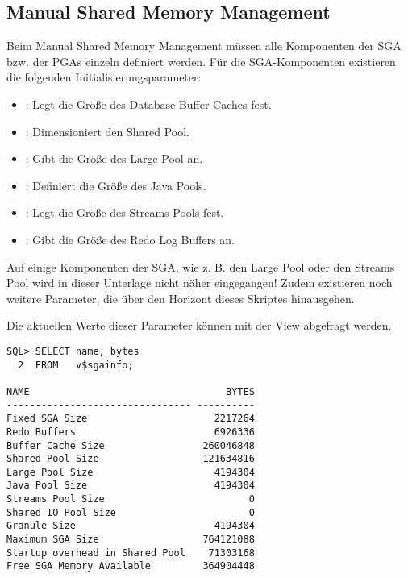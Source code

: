       \subsection{Manual Shared Memory Management}
        Beim Manual Shared Memory Management m\"ussen alle Komponenten der SGA bzw. der PGAs einzeln definiert werden. F\"ur die SGA-Komponenten existieren die folgenden Initialisierungsparameter:
        \begin{itemize}
          \item {}: Legt die Gr\"o\ss{}e des Database Buffer Caches fest.
          \item {}: Dimensioniert den Shared Pool.
          \item {}: Gibt die Gr\"o\ss{}e des Large Pool an.
          \item {}: Definiert die Gr\"o\ss{}e des Java Pools.
          \item {}: Legt die Gr\"o\ss{}e des Streams Pools fest.
          \item {}: Gibt die Gr\"o\ss{}e des Redo Log Buffers an.
        \end{itemize}
        \begin{merke}
          Auf einige Komponenten der SGA, wie z. B. den Large Pool oder den Streams Pool wird in dieser Unterlage nicht n\"aher eingegangen! Zudem existieren noch weitere Parameter, die \"uber den Horizont dieses Skriptes hinausgehen.
        \end{merke}
        Die aktuellen Werte dieser Parameter k\"onnen mit der View  abgefragt werden.
        \begin{lstlisting}[caption={Gr\"o\ss{}e der SGA-Komponenten ermitteln},label=admin22,language=oracle_sql]
SQL> SELECT name, bytes
  2  FROM   v$sgainfo;

NAME                                  BYTES
-------------------------------- ----------
Fixed SGA Size                      2217264
Redo Buffers                        6926336
Buffer Cache Size                 260046848
Shared Pool Size                  121634816
Large Pool Size                     4194304
Java Pool Size                      4194304
Streams Pool Size                         0
Shared IO Pool Size                       0
Granule Size                        4194304
Maximum SGA Size                  764121088
Startup overhead in Shared Pool    71303168
Free SGA Memory Available         364904448
        \end{lstlisting}
